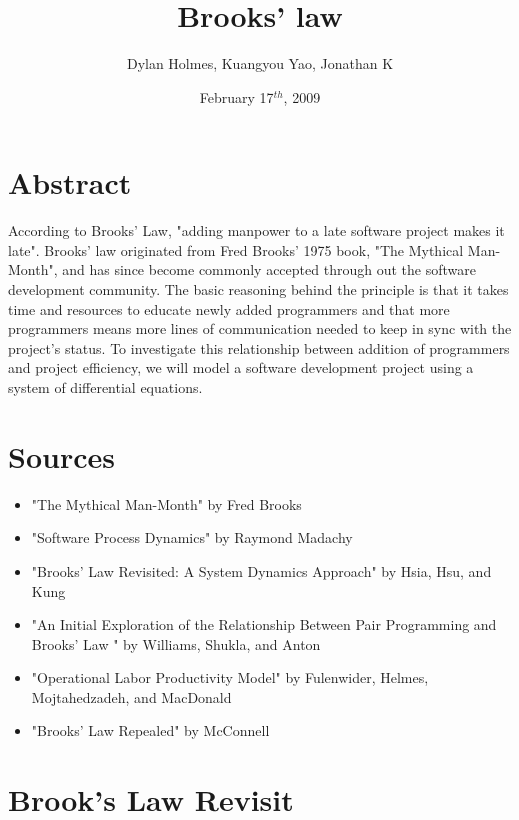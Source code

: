\documentclass{article}
\author{Dylan Holmes, Kuangyou Yao, Jonathan K
}
\title{Brooks' law}
\date{February 17$^{th}$, 2009}
\begin{document}
\maketitle



\section*{Abstract}
According to Brooks' Law, "adding manpower to a late software project makes it late". Brooks' law originated from Fred Brooks' 1975 book, "The Mythical Man-Month", and has since become commonly accepted through out the software development community. The basic reasoning behind the principle is that it takes time and resources to educate newly added programmers and that more programmers means more lines of communication needed to keep in sync with the project's status. To investigate this relationship between addition of programmers and project efficiency, we will model a software development project using a system of differential equations.

\section*{Sources}
\begin{itemize}
    \item "The Mythical Man-Month" by Fred Brooks
    \item "Software Process Dynamics" by Raymond Madachy
    \item "Brooks’ Law Revisited: A System Dynamics Approach" by Hsia, Hsu, and Kung
    \item "An Initial Exploration of the Relationship Between Pair Programming and Brooks’ Law
" by Williams, Shukla, and Anton
    \item "Operational Labor Productivity Model" by Fulenwider, Helmes, Mojtahedzadeh, and MacDonald
    \item "Brooks’ Law Repealed" by McConnell
\end{itemize}


\section*{Brook's Law Revisit}
\end{document}
